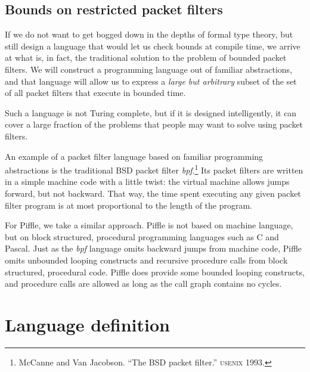 \documentclass[a4paper,12pt]{scrreprt}
\begin{document}
\section{Bounds on restricted packet filters}

If we do not want to get bogged down in the depths of formal type
theory, but still design a language that would let us check bounds at
compile time, we arrive at what is, in fact, the traditional solution
to the problem of bounded packet filters. We will construct a
programming language out of familiar abstractions, and that language
will allow us to express a \textit{large but arbitrary} subset of the
set of all packet filters that execute in bounded time. 

Such a language is not Turing complete, but if it is designed
intelligently, it can cover a large fraction of the problems that
people may want to solve using packet filters.

An example of a packet filter language based on familiar programming
abstractions is the traditional BSD packet filter
\textit{bpf}.\footnote{McCanne and Van Jacobson. ``The BSD packet
filter.'' \textsc{usenix} 1993.} Its packet filters are written in a simple
machine code with a little twist: the virtual machine allows jumps
forward, but not backward. That way, the time spent executing any
given packet filter program is at most proportional to the length of
the program.

For Piffle, we take a similar approach. Piffle is not based on machine
language, but on block structured, procedural programming languages
such as C and Pascal. Just as the \textit{bpf} language omits backward
jumps from machine code, Piffle omits unbounded looping constructs and
recursive procedure calls from block structured, procedural
code. Piffle does provide some bounded looping constructs, and
procedure calls are allowed as long as the call graph contains no
cycles.


\chapter{Language definition}

\def\code#1{\texttt{#1}}
\def\id#1{\,\text{\it #1}\,}
\def\lit#1{\;\code{\fbox{\raisebox{-0.1em}{\rule{0em}{0.8em}}#1}}\;}
\def\grp#1{\;(#1)\,}
\def\is{&=&}
\def\star{^*}
\def\plus{^+}
\def\opt{^?}
\def\bar{\,|\,}
\def\bbar{\\&\bar&}
\def\clause#1{\begin{eqnarray*}#1\end{eqnarray*}}
\end{document}
